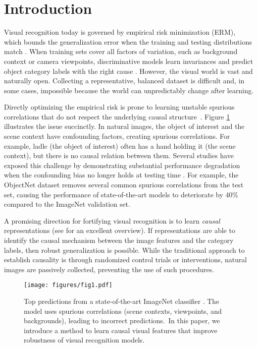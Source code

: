 \documentclass[final]{cvpr}
\begin{document}
\section{Introduction}

Visual recognition today is governed by empirical risk minimization (ERM), which bounds the generalization error when the training and testing distributions match \cite{ERM}.  When training sets cover all factors of variation, such as background context or camera viewpoints, discriminative models learn invariances and predict object category labels with the right cause \cite{pearl}.
However, the visual world is vast and naturally open. Collecting a representative, balanced dataset is difficult and, in some cases, impossible because the world can unpredictably change after learning.


Directly optimizing the empirical risk is prone to learning unstable spurious correlations that do not respect the underlying causal structure~\cite{causalfeature, arjovsky2019invariant,ilse2020designing, causalexplain, interventcausal, CIinvariant}.  Figure \ref{fig:teaser} illustrates the issue succinctly. In natural images, the object of interest and the scene context have confounding factors, creating spurious correlations. 
For example, ladle (the object of interest) often has a hand holding it (the scene context), but there is no causal relation between them. 
Several studies have exposed this challenge by demonstrating substantial performance degradation when the confounding bias no longer holds at testing time \cite{ImageNetOverfit, imagenetbiased}. For example, the ObjectNet \cite{Objectnet} dataset removes several common spurious correlations from the test set, causing the performance of state-of-the-art models to deteriorate by 40\% compared to the ImageNet validation set.


A promising direction for fortifying visual recognition is to learn \emph{causal} representations (see \cite{scholkopf2019causality} for an excellent overview). If representations are able to identify the causal mechanism between the image features and the category labels, then robust generalization is possible.
While the traditional approach to establish causality is through randomized control trials or interventions, natural images are passively collected, preventing the use of such procedures. 

\setcounter{footnote}{-1}
\begin{figure}
    \centering
    \texttt{[image: figures/fig1.pdf]}
    \caption[]{Top predictions from a state-of-the-art ImageNet classifier \cite{He_2016}. The model uses spurious correlations (scene contexts, viewpoints, and backgrounds), leading to incorrect predictions.\footnotemark\ In this paper, we introduce a method to learn causal visual features that improve robustness of visual recognition models.}
    \label{fig:teaser}
    \vspace{-5mm}
\end{figure}
\end{document}
